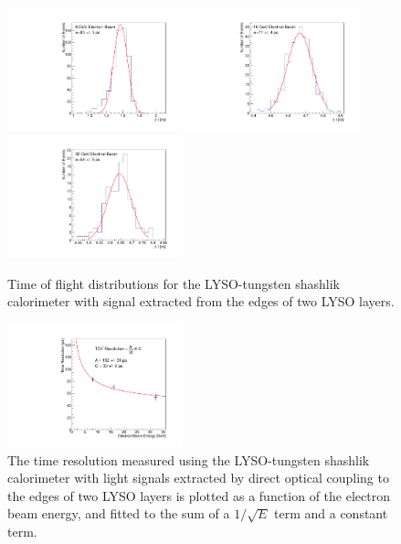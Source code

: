 \documentclass[12pt]{article}
\begin{document}
{\begin{figure}[H] \centering
\includegraphics[width=0.45\textwidth]{figs/TOF_ShashlikSideReadout_Electron_8GeV} 
\includegraphics[width=0.45\textwidth]{figs/TOF_ShashlikSideReadout_Electron_16GeV} 
\includegraphics[width=0.45\textwidth]{figs/TOF_ShashlikSideReadout_Electron_32GeV} 
\caption{ Time of flight distributions for the LYSO-tungsten shashlik calorimeter
with signal extracted from the edges of two LYSO layers. } 
\label{fig:ShashlikSideReadoutTOF}
\end{figure}

\begin{figure}[H] \centering
\includegraphics[width=0.45\textwidth]{figs/TimeResolutionVsEnergy_ShashlikSideReadout} 
\caption{ The time resolution measured using the LYSO-tungsten shashlik calorimeter
with light signals extracted by direct optical coupling to the edges of two LYSO layers 
is plotted as a function of the electron beam energy, and fitted to the sum 
of a $1/\sqrt{E}$ term and a constant term. }
\label{fig:ShashlikSideReadoutTOFResolutionVsEnergy}
\end{figure}

}
\end{document}
